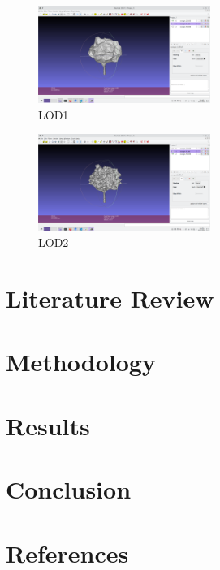 \documentclass[12pt]{article}
\begin{document}
\begin{figure}[H]
    \vspace{1.5cm}
    \centering
    \includegraphics[width=0.5\textwidth]{images/LOD1.png}
    \caption{LOD1}
\end{figure}

\begin{figure}[H]
    \vspace{1.5cm}
    \centering
    \includegraphics[width=0.5\textwidth]{images/LOD2.png}
    \caption{LOD2}
\end{figure}


\newpage
\section{Literature Review}

\newpage

\section{Methodology}

\newpage

\section{Results}

\newpage

\section{Conclusion}

\newpage

\section{References}
\nocite{*}


\end{document}
